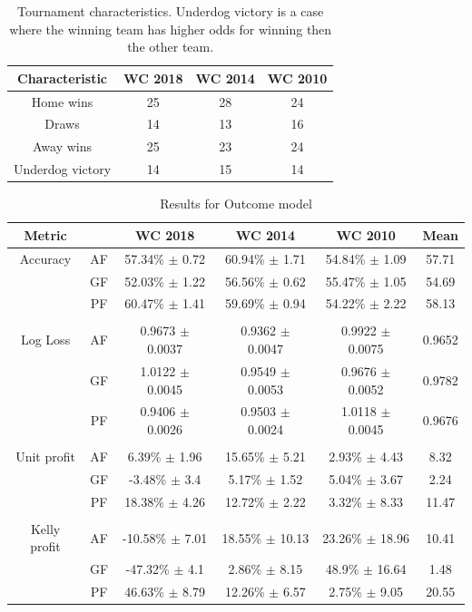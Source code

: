 \begin{table}
    \caption{Tournament characteristics. Underdog victory is a case where the winning team has higher odds for winning then the other team.}
    \begin{tabular}{| c | c|c | c|}
        \hline
        Characteristic & \textbf{WC 2018} & \textbf{WC 2014} & \textbf{WC 2010}\\
        \hline
        Home wins & 25 & 28 & 24\\
        Draws & 14 & 13 & 16\\
        Away wins & 25 & 23 & 24\\
        Underdog victory  & 14 & 15 & 14\\
        \hline
    \end{tabular}
    \label{table:tournamentcharacteristics}
\end{table}


\begin{table}
    \caption{Results for Outcome model}
    \begin{tabular}{| c  c| c| c| c|c|}
        \hline
        Metric& & \textbf{WC 2018} & \textbf{WC 2014} & \textbf{WC 2010} & Mean\\
        \hline
        Accuracy & AF & 57.34\% $\pm$ 0.72 & 60.94\% $\pm$ 1.71 & 54.84\% $\pm$ 1.09& 57.71 \\
         & GF & 52.03\% $\pm$ 1.22 & 56.56\% $\pm$ 0.62 & 55.47\% $\pm$ 1.05& 54.69 \\
         & PF & 60.47\% $\pm$ 1.41 & 59.69\% $\pm$ 0.94 & 54.22\% $\pm$ 2.22& 58.13 \\
         & & & & & \\
        Log Loss & AF & 0.9673 $\pm$ 0.0037 & 0.9362 $\pm$ 0.0047 & 0.9922 $\pm$ 0.0075& 0.9652 \\
         & GF & 1.0122 $\pm$ 0.0045 & 0.9549 $\pm$ 0.0053 & 0.9676 $\pm$ 0.0052& 0.9782 \\
         & PF & 0.9406 $\pm$ 0.0026 & 0.9503 $\pm$ 0.0024 & 1.0118 $\pm$ 0.0045& 0.9676 \\
         & & & & & \\
        Unit profit & AF & 6.39\% $\pm$ 1.96 & 15.65\% $\pm$ 5.21 & 2.93\% $\pm$ 4.43& 8.32 \\
         & GF & -3.48\% $\pm$ 3.4 & 5.17\% $\pm$ 1.52 & 5.04\% $\pm$ 3.67& 2.24 \\
         & PF & 18.38\% $\pm$ 4.26 & 12.72\% $\pm$ 2.22 & 3.32\% $\pm$ 8.33& 11.47 \\
         & & & & & \\
        Kelly profit & AF & -10.58\% $\pm$ 7.01 & 18.55\% $\pm$ 10.13 & 23.26\% $\pm$ 18.96& 10.41 \\
         & GF & -47.32\% $\pm$ 4.1 & 2.86\% $\pm$ 8.15 & 48.9\% $\pm$ 16.64& 1.48 \\
         & PF & 46.63\% $\pm$ 8.79 & 12.26\% $\pm$ 6.57 & 2.75\% $\pm$ 9.05& 20.55 \\
 \hline
    \end{tabular}
    \label{table:outcomemodel}
\end{table}


